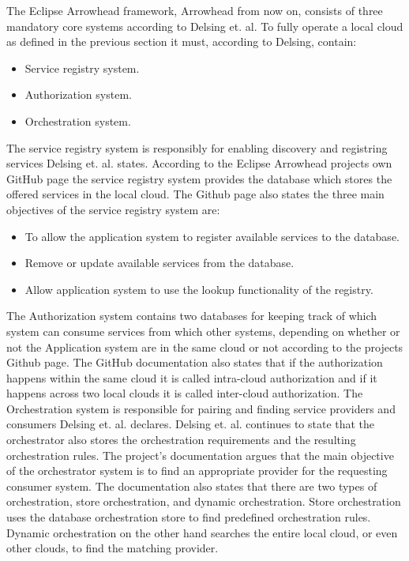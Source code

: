 The Eclipse Arrowhead framework, Arrowhead from now on, consists of three mandatory core systems according to Delsing et. al.\cite{Delsing2017}
To fully operate a local cloud as defined in the previous section it must, according to Delsing, contain:
\begin{itemize}
    \item Service registry system.
    \item Authorization system. 
    \item Orchestration system.\cite{Delsing2017}
\end{itemize} 

The service registry system is responsibly for enabling discovery and registring services Delsing et. al. states.\cite{Delsing2017} 
According to the Eclipse Arrowhead projects own GitHub page the service registry system provides the database which stores the offered services in the local cloud.\cite{Github2021}
The Github page also states the three main objectives of the service registry system are:
\begin{itemize}
    \item To allow the application system to register available services to the database. 
    \item Remove or update available services from the database.
    \item Allow application system to use the lookup functionality of the registry.
\end{itemize}
The Authorization system contains two databases for keeping track of which system can consume services from which other systems, depending on whether or not the Application system are in the same cloud or not according to the projects Github page.\cite{Github2021}
The GitHub documentation also states that if the authorization happens within the same cloud it is called intra-cloud authorization and if it happens across two local clouds it is called inter-cloud authorization.\cite{Github2021}
The Orchestration system is responsible for pairing and finding service providers and consumers Delsing et. al. declares.\cite{Delsing2017} 
Delsing et. al. continues to state that the orchestrator also stores the orchestration requirements and the resulting orchestration rules.\cite{Delsing2017} 
The project's documentation argues that the main objective of the orchestrator system is to find an appropriate provider for the requesting consumer system.\cite{Github2021}
The documentation also states that there are two types of orchestration, store orchestration, and dynamic orchestration.
Store orchestration uses the database orchestration store to find predefined orchestration rules.
Dynamic orchestration on the other hand searches the entire local cloud, or even other clouds, to find the matching provider.\cite{Github2021}

